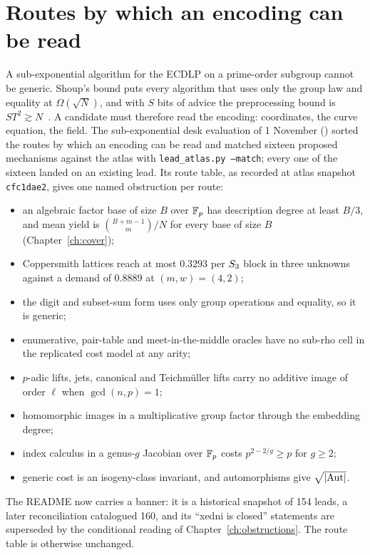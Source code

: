 \section{Routes by which an encoding can be read}\label{sec:um-routes}

A sub-exponential algorithm for the ECDLP on a prime-order subgroup cannot
be generic. Shoup's bound puts every algorithm that uses only the group law
and equality at $\Omega(\sqrt N)$, and with $S$ bits of advice the
preprocessing bound is $ST^2\gtrsim N$~\cite{cgk2018}. A candidate must
therefore read the encoding: coordinates, the curve equation, the field.
The sub-exponential desk evaluation of 1 November
() sorted the routes by
which an encoding can be read and matched sixteen proposed mechanisms
against the atlas with \texttt{lead\_atlas.py --match}; every one of the
sixteen landed on an existing lead. Its route table, as recorded at atlas
snapshot \texttt{cfc1dae2}, gives one named obstruction per route:
\begin{itemize}
\item an algebraic factor base of size $B$ over $\mathbb{F}_p$ has description
  degree at least $B/3$, and mean yield is $\binom{B+m-1}m/N$ for every base
  of size $B$ (Chapter~\ref{ch:cover});
\item Coppersmith lattices reach at most $0.3293$ per $S_{3}$ block in three
  unknowns against a demand of $0.8889$ at $(m,w)=(4,2)$;
\item the digit and subset-sum form uses only group operations and
  equality, so it is generic;
\item enumerative, pair-table and meet-in-the-middle oracles have no
  sub-rho cell in the replicated cost model at any arity;
\item $p$-adic lifts, jets, canonical and Teichm\"uller lifts carry no
  additive image of order $\ell$ when $\gcd(n,p)=1$;
\item homomorphic images in a multiplicative group factor through the
  embedding degree;
\item index calculus in a genus-$g$ Jacobian over $\mathbb{F}_p$ costs
  $p^{2-2/g}\ge p$ for $g\ge2$;
\item generic cost is an isogeny-class invariant, and automorphisms give
  $\sqrt{\lvert \mathrm{Aut} \rvert}$.
\end{itemize}
The README now carries a banner: it is a historical snapshot of 154 leads,
a later reconciliation catalogued 160, and its ``xedni is closed''
statements are superseded by the conditional reading of
Chapter~\ref{ch:obstructions}. The route table is otherwise unchanged.

